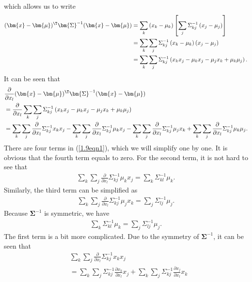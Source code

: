 \begin{answer}{}
	which allows us to write
	\begin{align}
		(\bm{x}-\bm{\mu})^{\T}\bm{\Sigma}^{-1}(\bm{x}-\bm{\mu}) &= \sum_k \left(x_k - \mu_k\right)\left[\sum_j \Sigma_{kj}^{-1} \left(x_j - \mu_j\right)\right]\\
		&= \sum_k \sum_j \Sigma_{kj}^{-1} \left(x_k - \mu_k\right) \left(x_j - \mu_j\right)\\
		&=  \sum_k \sum_j \Sigma_{kj}^{-1} \left(x_k x_j - \mu_k x_j - \mu_j x_k + \mu_k \mu_j\right).
	\end{align}
	It can be seen that
	\begin{align}
		&\frac{\partial}{\partial x_l} (\bm{x}-\bm{\mu})^{\T}\bm{\Sigma}^{-1}(\bm{x}-\bm{\mu})\\
		&= \frac{\partial}{\partial x_l} \sum_k \sum_j \Sigma_{kj}^{-1} \left(x_k x_j - \mu_k x_j - \mu_j x_k + \mu_k \mu_j\right)\\
		&= \sum_k \sum_j \frac{\partial}{\partial x_l} \Sigma_{kj}^{-1}x_k x_j - \sum_k \sum_j \frac{\partial}{\partial x_l} \Sigma_{kj}^{-1} \mu_k x_j - \sum_k \sum_j \frac{\partial}{\partial x_l} \Sigma_{kj}^{-1} \mu_j x_k + \sum_k \sum_j \frac{\partial}{\partial x_l} \Sigma_{kj}^{-1} \mu_k \mu_j. \label{1.9eqn1}
	\end{align}
	There are four terms in (\ref{1.9eqn1}), which we will simplify one by one. It is obvious that the fourth term equals to zero. For the second term, it is not hard to see that
	\begin{align}
		\sum_k \sum_j \frac{\partial}{\partial x_l} \Sigma_{kj}^{-1} \mu_k x_j = \sum_k \Sigma_{kl}^{-1} \mu_k.
	\end{align}
	Similarly, the third term can be simplified as
	\begin{align}
		\sum_k \sum_j \frac{\partial}{\partial x_l} \Sigma_{kj}^{-1} \mu_j x_k = \sum_j \Sigma_{lj}^{-1} \mu_j.
	\end{align}
	Because $\bm{\Sigma}^{-1}$ is symmetric, we have
	\begin{align}
		\sum_k \Sigma_{kl}^{-1} \mu_k = \sum_j \Sigma_{lj}^{-1} \mu_j.
	\end{align}
	The first term is a bit more complicated. Due to the symmetry of $\bm{\Sigma}^{-1}$, it can be seen that
	\begin{align}
		&\sum_k \sum_j \frac{\partial}{\partial x_l} \Sigma_{kj}^{-1}x_k x_j\\ 
		& = \sum_k \sum_j \Sigma_{kj}^{-1} \frac{\partial x_k}{\partial x_l}x_j + \sum_k \sum_j \Sigma_{kj}^{-1} \frac{\partial x_j}{\partial x_l}x_k\\

\end{align}
\end{answer}
